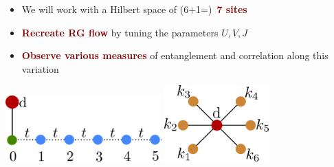 \documentclass[aspectratio=169]{beamer}
\newcommand{\focus}[1]{\textcolor{maroon}{\textbf{#1}}}
\begin{document}
\centering
\begin{frame}[noframenumbering]{}
\begin{itemize}
	\item We will work with a Hilbert space of (6+1=)~\focus{7 sites}
	\item \focus{Recreate RG flow} by tuning the parameters \(U,V,J\)
	\item \focus{Observe various measures} of entanglement and correlation along this variation
\end{itemize}

\vspace*{20pt}
\hspace{\fill}
\includegraphics[width=0.45\textwidth]{figures/seven_site.pdf}
\hspace{\fill}
\includegraphics[width=0.3\textwidth]{figures/seven_site2.pdf}
\hspace{\fill}
\end{frame}
\end{document}
